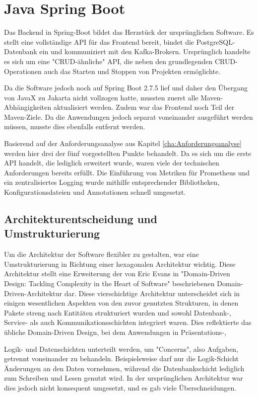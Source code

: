 \section{Java Spring Boot}
Das Backend in Spring-Boot bildet das Herzstück der ursprünglichen Software. Es stellt eine vollständige API für das Frontend bereit, bindet die PostgreSQL-Datenbank ein und kommuniziert mit den Kafka-Brokern. 
Ursprünglich handelte es sich um eine "CRUD-ähnliche" API, die neben den grundlegenden CRUD-Operationen auch das Starten und Stoppen von Projekten ermöglichte.

Da die Software jedoch noch auf Spring Boot 2.7.5 lief und daher den Übergang von JavaX zu Jakarta nicht vollzogen hatte, mussten zuerst alle Maven-Abhängigkeiten aktualisiert werden. Zudem war das Frontend noch Teil der Maven-Ziele. 
Da die Anwendungen jedoch separat voneinander ausgeführt werden müssen, musste dies ebenfalls entfernt werden.

Basierend auf der Anforderungsanalyse aus Kapitel \ref{cha:Anforderungsanalyse} werden hier drei der fünf vorgestellten Punkte behandelt. Da es sich um die erste API handelt, die lediglich erweitert wurde, waren viele der 
technischen Anforderungen bereits erfüllt. Die Einführung von Metriken für Prometheus und ein zentralisiertes Logging wurde mithilfe entsprechender Bibliotheken, Konfigurationsdateien und Annotationen schnell umgesetzt.

\subsection{Architekturentscheidung und Umstrukturierung}
Um die Architektur der Software flexibler zu gestalten, war eine Umstrukturierung in Richtung einer hexagonalen Architektur wichtig. Diese Architektur stellt eine Erweiterung der von Eric Evans in "Domain-Driven Design: 
Tackling Complexity in the Heart of Software" \cite{evans2004ddd} beschriebenen Domain-Driven-Architektur dar. Diese vierschichtige Architektur unterscheidet sich in einigen wesentlichen Aspekten von den zuvor genutzten Strukturen, 
in denen Pakete streng nach Entitäten strukturiert wurden und sowohl Datenbank-, Service- als auch Kommunikationsschichten integriert waren. Dies reflektierte das übliche Domain-Driven Design, bei dem Anwendungen in Präsentations-, 

Logik- und Datenschichten unterteilt werden, um "Concerns", also Aufgaben, getrennt voneinander zu behandeln. Beispielsweise darf nur die Logik-Schicht Änderungen an den Daten vornehmen, während die Datenbankschicht lediglich zum Schreiben und 
Lesen genutzt wird. In der ursprünglichen Architektur war dies jedoch nicht konsequent umgesetzt, und es gab viele Überschneidungen.

